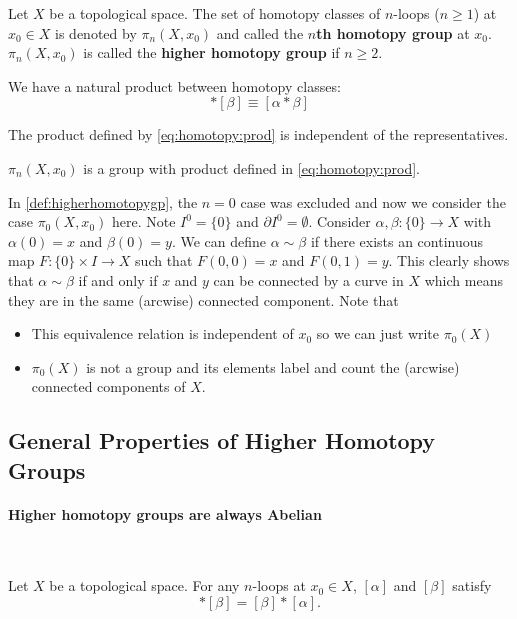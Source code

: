 \documentclass[10pt]{article}
\begin{document}
\begin{definition}
    Let $X$ be a topological space.
    The set of homotopy classes of $n$-loops ($n\geq1$) at $x_0\in X$ is denoted by $\pi_n(X,x_0)$ and called the \textbf{$n$th homotopy group} at $x_0$.
    $\pi_n(X,x_0)$ is called the \textbf{higher homotopy group} if $n\geq2$.
\end{definition}

We have a natural product between homotopy classes:
\begin{equation}
    [\alpha]\ast[\beta]\equiv[\alpha\ast\beta]\label{eq:homotopy:prod}
\end{equation}
\begin{lemma}
    The product defined by \cref{eq:homotopy:prod} is independent of the representatives.
\end{lemma}
\begin{proposition}
    $\pi_n(X,x_0)$ is a group with product defined in \cref{eq:homotopy:prod}.
\end{proposition}

\begin{remark}
    In \cref{def:higherhomotopygp}, the $n=0$ case was excluded and now we consider the case $\pi_0(X,x_0)$ here.
    Note $I^0=\{0\}$ and $\partial I^0=\emptyset$. 
    Consider $\alpha,\beta:\{0\}\to X$ with $\alpha(0)=x$ and $\beta(0)=y$.
    We can define $\alpha\sim\beta$ if there exists an continuous map $F:\{0\}\times I\to X$ such that $F(0,0)=x$ and $F(0,1)=y$.
    This clearly shows that $\alpha\sim\beta$ if and only if $x$ and $y$ can be connected by a curve in $X$ which means they are in the same (arcwise) connected component.
    Note that
    \begin{itemize}
        \item This equivalence relation is independent of $x_0$ so we can just write $\pi_0(X)$
        \item $\pi_0(X)$ is not a group and its elements label and count the (arcwise) connected components of $X$.
    \end{itemize}
\end{remark}

\subsection{General Properties of Higher Homotopy Groups}
\paragraph{Higher homotopy groups are always Abelian}\ 
\begin{proposition}
    Let $X$ be a topological space.
    For any $n$-loops at $x_0\in X$, $[\alpha]$ and $[\beta]$ satisfy 
    \begin{equation}
        [\alpha]\ast[\beta]=[\beta]\ast[\alpha].
    \end{equation}
\end{proposition}
\end{document}
